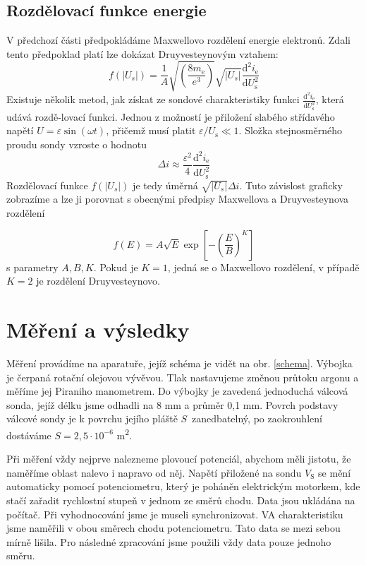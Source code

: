 \documentclass[a4paper,12pt]{article}
\begin{document}
\subsection{Rozdělovací funkce energie}
V předchozí části předpokládáme Maxwellovo rozdělení energie elektronů.
Zdali tento předpoklad platí lze dokázat Druyvesteynovým vztahem:
\begin{equation}
	f(\vert U_s\vert) = 
	\frac{1}{A}\sqrt{\left(\frac{8m_\text{e}}{e^3}\right)} \sqrt{\vert 
	U_s\vert} \frac{\text{d}^2i_\text{e}}{\text{d}U^2_\text{s}}
\label{Druyvesteyn}
\end{equation}
Existuje několik metod, jak získat ze sondové charakteristiky funkci 
$\frac{\text{d}^2i_\text{e}}{\text{d}U^2_\text{s}}$, která udává 
roz\-dě\--lo\-va\-cí 
funkci. Jednou z %
možností je přiložení 
slabého střídavého napětí 
$U=\varepsilon\sin(\omega t)$, přičemž musí platit 
$\varepsilon/U_\text{s}\ll1$. Složka stejnosměrného proudu sondy vzroste o 
hodnotu 
\begin{equation}
\Delta i \approx 
\frac{\varepsilon^2}{4}\frac{\text{d}^2i_\text{e}}{\text{d}U^2_\text{s}}
\label{delta i}
\end{equation}
Rozdělovací funkce $f(\vert U_s\vert)$ je tedy úměrná $\sqrt{\vert 
U_s\vert}\Delta i$. Tuto závislost graficky zobrazíme a lze ji porovnat s 
obecnými předpisy Maxwellova a Druyvesteynova rozdělení

\begin{equation}
	f(E) = A \sqrt{E} \exp \left[ -\left( \frac{E}{B} \right)^K \right]
	\label{eq:rozdeleni}
\end{equation}
s parametry $A,B,K$. Pokud je $K=1$, jedná se o Maxwellovo rozdělení, v případě 
$K=2$ je rozdělení Druyvesteynovo.

\newpage
\section{Měření a výsledky}
Měření provádíme na aparatuře, jejíž schéma je vidět na obr. \ref{schema}. Výbojka je čerpaná rotační olejovou vývěvou. Tlak
nastavujeme změnou průtoku argonu a měříme jej Piraniho manometrem. Do výbojky je zavedená jednoduchá válcová sonda, jejíž délku jsme
odhadli na 8 \si{\milli\meter} a průměr 0,1 \si{\milli\meter}. Povrch podstavy válcové sondy je k povrchu jejího pláště $S$~zanedbatelný, po zaokrouhlení dostáváme $S = 2,5\cdot10^{-6}$ \si{\meter\squared}. 

Při měření vždy nejprve nalezneme plovoucí potenciál, abychom měli jistotu, že naměříme oblast 
nalevo i napravo od něj. Napětí přiložené na sondu $V_\text{S}$ se mění automaticky pomocí 
potenciometru, který je poháněn elektrickým motorkem, kde stačí zařadit rychlostní stupeň v jednom
ze směrů chodu. Data jsou ukládána na počítač. Při vyhodnocování jsme je museli 
synchronizovat. VA charakteristiku jsme naměřili v obou směrech chodu 
potenciometru. Tato data se mezi sebou mírně lišila. Pro následné zpracování 
jsme použili vždy data pouze jednoho směru.
\end{document}
